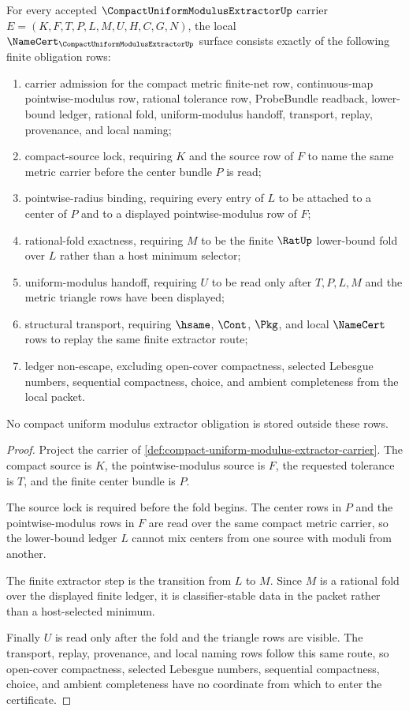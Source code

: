 \begin{theorem}
\label{thm:compact-uniform-modulus-extractor-obligations}
For every accepted $\CompactUniformModulusExtractorUp$ carrier $E=(K,F,T,P,L,M,U,H,C,G,N)$, the local $\NameCert_{\CompactUniformModulusExtractorUp}$ surface consists exactly of the following finite obligation rows:
\begin{enumerate}
\item carrier admission for the compact metric finite-net row, continuous-map pointwise-modulus row, rational tolerance row, ProbeBundle readback, lower-bound ledger, rational fold, uniform-modulus handoff, transport, replay, provenance, and local naming;
\item compact-source lock, requiring $K$ and the source row of $F$ to name the same metric carrier before the center bundle $P$ is read;
\item pointwise-radius binding, requiring every entry of $L$ to be attached to a center of $P$ and to a displayed pointwise-modulus row of $F$;
\item rational-fold exactness, requiring $M$ to be the finite $\RatUp$ lower-bound fold over $L$ rather than a host minimum selector;
\item uniform-modulus handoff, requiring $U$ to be read only after $T,P,L,M$ and the metric triangle rows have been displayed;
\item structural transport, requiring $\hsame$, $\Cont$, $\Pkg$, and local $\NameCert$ rows to replay the same finite extractor route;
\item ledger non-escape, excluding open-cover compactness, selected Lebesgue numbers, sequential compactness, choice, and ambient completeness from the local packet.
\end{enumerate}
No compact uniform modulus extractor obligation is stored outside these rows.
\end{theorem}
\begin{proof}
Project the carrier of \autoref{def:compact-uniform-modulus-extractor-carrier}. The compact source is $K$, the pointwise-modulus source is $F$, the requested tolerance is $T$, and the finite center bundle is $P$.

The source lock is required before the fold begins. The center rows in $P$ and the pointwise-modulus rows in $F$ are read over the same compact metric carrier, so the lower-bound ledger $L$ cannot mix centers from one source with moduli from another.

The finite extractor step is the transition from $L$ to $M$. Since $M$ is a rational fold over the displayed finite ledger, it is classifier-stable data in the packet rather than a host-selected minimum.

Finally $U$ is read only after the fold and the triangle rows are visible. The transport, replay, provenance, and local naming rows follow this same route, so open-cover compactness, selected Lebesgue numbers, sequential compactness, choice, and ambient completeness have no coordinate from which to enter the certificate.
\end{proof}

